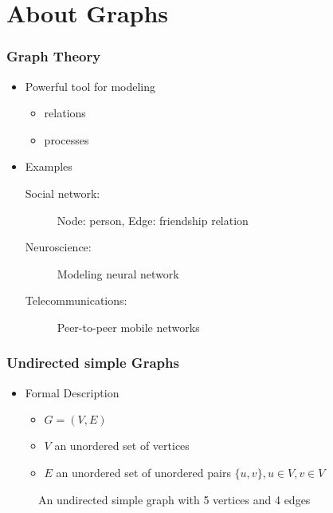 \section{About Graphs}
\begin{frame}
	\frametitle{Graph Theory}
	\begin{itemize}
		\item Powerful tool for modeling
			\begin{itemize}
				\item relations
				\item processes
			\end{itemize}
		\item Examples
			\begin{description}
				\item [Social network:] Node: person, Edge: friendship relation
				\item [Neuroscience:] Modeling neural network  \cite{BuSp09}
				\item [Telecommunications:] Peer-to-peer mobile networks  \cite{FaCh99}
			\end{description}
	\end{itemize}
\end{frame}

\begin{frame}
	\frametitle{Undirected simple Graphs}
	\begin{itemize}
		\item Formal Description
			\begin{itemize}
				\item $G = (V,E)$
				\item $V$ an unordered set of vertices
				\item $E$ an unordered set of unordered pairs $\{u,v\}, u \in V, v \in V$
			\end{itemize}
	\end{itemize}
	\begin{figure}
		\begin{center}
			
		\end{center}
		\caption{An undirected simple graph with 5 vertices and 4 edges}
	\end{figure}
\end{frame}


